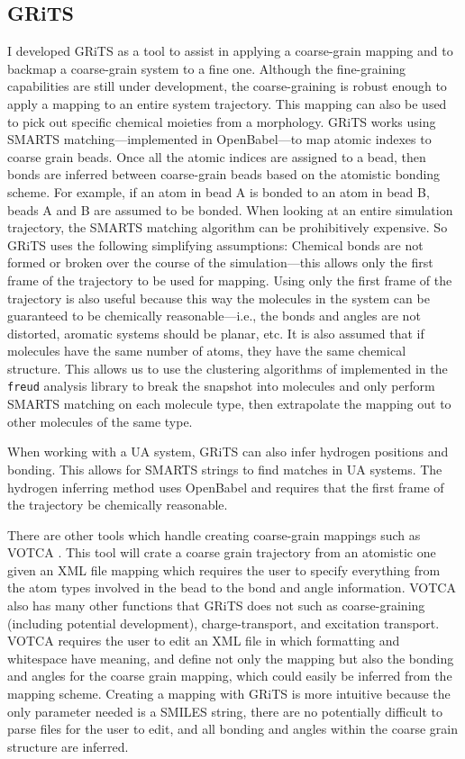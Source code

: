 \subsection{GRiTS}
I developed GRiTS as a tool to assist in applying a coarse-grain mapping and to backmap a coarse-grain system to a fine one. 
Although the fine-graining capabilities are still under development, the coarse-graining is robust enough to apply a mapping to an entire system trajectory. 
This mapping can also be used to pick out specific chemical moieties from a morphology. 
GRiTS works using SMARTS matching---implemented in OpenBabel---to map atomic indexes to coarse grain beads. 
Once all the atomic indices are assigned to a bead, then bonds are inferred between coarse-grain beads based on the atomistic bonding scheme. 
For example, if an atom in bead A is bonded to an atom in bead B, beads A and B are assumed to be bonded. 
When looking at an entire simulation trajectory, the SMARTS matching algorithm can be prohibitively expensive.
So GRiTS uses the following simplifying assumptions: Chemical bonds are not formed or broken over the course of the simulation---this allows only the first frame of the trajectory to be used for mapping. 
Using only the first frame of the trajectory is also useful because this way the molecules in the system can be guaranteed to be chemically reasonable---i.e., the bonds and angles are not distorted, aromatic systems should be planar, etc. 
It is also assumed that if molecules have the same number of atoms, they have the same chemical structure. 
This allows us to use the clustering algorithms of implemented in the \texttt{freud} analysis library to break the snapshot into molecules and only perform SMARTS matching on each molecule type, then extrapolate the mapping out to other molecules of the same type.

When working with a UA system, GRiTS can also infer hydrogen positions and bonding. This allows for SMARTS strings to find matches in UA systems. The hydrogen inferring method uses OpenBabel and requires that the first frame of the trajectory be chemically reasonable.

There are other tools which handle creating coarse-grain mappings such as VOTCA \citep{Ruhle2009}. 
This tool will crate a coarse grain trajectory from an atomistic one given an XML file mapping which requires the user to specify everything from the atom types involved in the bead to the bond and angle information.
VOTCA also has many other functions that GRiTS does not such as coarse-graining (including potential development), charge-transport, and excitation transport.
VOTCA requires the user to edit an XML file in which formatting and whitespace have meaning, and define not only the mapping but also the bonding and angles for the coarse grain mapping, which could easily be inferred from the mapping scheme.
Creating a mapping with GRiTS is more intuitive because the only parameter needed is a SMILES string, there are no potentially difficult to parse files for the user to edit, and all bonding and angles within the coarse grain structure are inferred.


